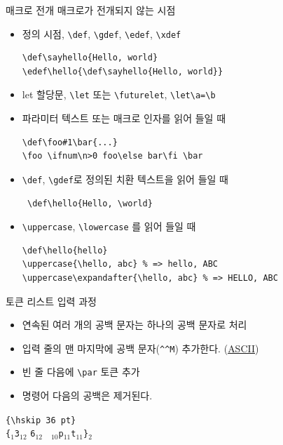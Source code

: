 \documentclass{beamer}
\begin{document}
%
\begin{frame}[fragile]{매크로 전개}
  매크로가 전개되지 않는 시점
  \begin{itemize}
  \item 정의 시점, \verb+\def+, \verb+\gdef+, \verb+\edef+, \verb+\xdef+
    {\small
\begin{verbatim}
\def\sayhello{Hello, world}
\edef\hello{\def\sayhello{Hello, world}}
\end{verbatim}}
  \item let 할당문, \verb+\let+ 또는 \verb+\futurelet+, \verb+\let\a=\b+
  \item 파라미터 텍스트 또는 매크로 인자를 읽어 들일 때
    {\small
\begin{verbatim}
\def\foo#1\bar{...}
\foo \ifnum\n>0 foo\else bar\fi \bar
\end{verbatim}}
  \item \verb+\def+, \verb+\gdef+로 정의된 치환 텍스트을 읽어 들일 때
  {\small \begin{verbatim} \def\hello{Hello, \world}\end{verbatim}}
  \item \verb+\uppercase+, \verb+\lowercase+ 를 읽어 들일 때
    {\small \begin{verbatim}
\def\hello{hello}
\uppercase{\hello, abc} % => hello, ABC
\uppercase\expandafter{\hello, abc} % => HELLO, ABC  
\end{verbatim}}
  \end{itemize}
\end{frame}


%
\begin{frame}[fragile]{토큰 리스트}
  \alert{입력 과정}

  \begin{itemize}
  \item 연속된 여러 개의 공백 문자는 하나의 공백 문자로 처리
  \item 입력 줄의 맨 마지막에 공백 문자(\verb+^^M+) 추가한다.
    (\href{http://www.asciitable.com}{ASCII})
  \item 빈 줄 다음에 \verb+\par+ 토큰 추가
  \item 명령어 다음의 공백은 제거된다.
  \end{itemize}
  
  \verb*+{\hskip 36 pt}+\\
  \bigskip
  \verb|{|$_1$\quad{}\quad\verb|3|$_{12}$
  \quad\verb|6|$_{12}$\quad
  \verb*| |$_{10}$\quad\verb|p|$_{11}$\quad\verb|t|$_{11}$\quad\verb|}|$_{2}$
\end{frame}
\end{document}
